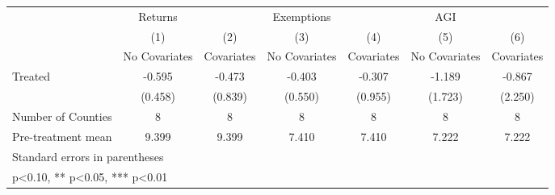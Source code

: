 {
\def\sym#1{\ifmmode^{#1}\else\(^{#1}\)\fi}
\begin{tabular}{l*{6}{c}}
\hline\hline
            &     Returns   &               &  Exemptions   &               &         AGI   &               \\
            &\multicolumn{1}{c}{(1)}&\multicolumn{1}{c}{(2)}&\multicolumn{1}{c}{(3)}&\multicolumn{1}{c}{(4)}&\multicolumn{1}{c}{(5)}&\multicolumn{1}{c}{(6)}\\
            &\multicolumn{1}{c}{No Covariates}&\multicolumn{1}{c}{Covariates}&\multicolumn{1}{c}{No Covariates}&\multicolumn{1}{c}{Covariates}&\multicolumn{1}{c}{No Covariates}&\multicolumn{1}{c}{Covariates}\\
\hline
Treated     &      -0.595   &      -0.473   &      -0.403   &      -0.307   &      -1.189   &      -0.867   \\
            &     (0.458)   &     (0.839)   &     (0.550)   &     (0.955)   &     (1.723)   &     (2.250)   \\
\hline
Number of Counties&           8   &           8   &           8   &           8   &           8   &           8   \\
Pre-treatment mean&       9.399   &       9.399   &       7.410   &       7.410   &       7.222   &       7.222   \\
\hline\hline
\multicolumn{7}{l}{\footnotesize Standard errors in parentheses}\\
\multicolumn{7}{l}{\footnotesize * p<0.10, ** p<0.05, *** p<0.01}\\
\end{tabular}
}
